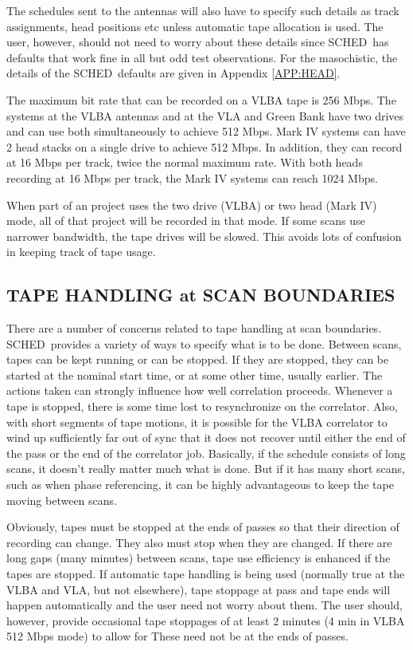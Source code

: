 \documentclass{report}
\newcommand{\schedb}{{\sc SCHED~}}
\begin{document}
The schedules sent to the antennas will also have to specify such
details as track assignments, head positions etc unless automatic
tape allocation is used.  The user, however, should not need to
worry about these details since \schedb has defaults that work fine
in all but odd test observations.  For the masochistic, the details
of the \schedb defaults are given in Appendix \ref{APP:HEAD}.

The maximum bit rate that can be recorded on a VLBA tape is 256 Mbps.
The systems at the VLBA antennas and at the VLA and Green Bank have
two drives and can use both simultaneously to achieve 512 Mbps.
Mark IV systems can have 2 head stacks on a single drive to achieve
512 Mbps.  In addition, they can record at 16 Mbps per track, twice
the normal maximum rate.  With both heads recording at 16 Mbps per
track, the Mark IV systems can reach 1024 Mbps.

When part of an project uses the two drive (VLBA) or two head
(Mark IV) mode, all of that project will be recorded in that mode.
If some scans use narrower bandwidth, the tape drives will be slowed.
This avoids lots of confusion in keeping track of tape usage.

\subsection{\label{SSSEC:TAPESCAN}TAPE HANDLING at SCAN BOUNDARIES}

There are a number of concerns related to tape handling at scan
boundaries.  \schedb provides a variety of ways to specify what is
to be done.  Between scans, tapes can be kept running or can be
stopped.  If they are stopped, they can be started at the nominal
start time, or at some other time, usually earlier.  The actions
taken can strongly influence how well correlation proceeds.  Whenever
a tape is stopped, there is some time lost to resynchronize on
the correlator.  Also, with short segments of tape motions, it is
possible for the VLBA correlator to wind up sufficiently far out
of sync that it does not recover until either the end of the pass
or the end of the correlator job.  Basically, if the schedule consists
of long scans, it doesn't really matter much what is done.  But if
it has many short scans, such as when phase referencing, it can be
highly advantageous to keep the tape moving between scans.

Obviously, tapes must be stopped at the ends of passes so that their
direction of recording can change.  They also must stop when they are
changed.  If there are long gaps (many minutes) between scans, tape
use efficiency is enhanced if the tapes are stopped.  If automatic
tape handling is being used (normally true at the VLBA and VLA, but
not elsewhere), tape stoppage at pass and tape ends will happen
automatically and the user need not worry about them.  The user
should, however, provide occasional tape stoppages of at least 2
minutes (4 min in VLBA 512 Mbps mode) to allow for  These need not be at the ends of passes.
\end{document}

